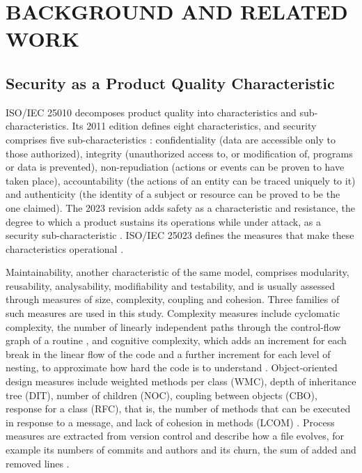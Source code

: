 \documentclass[a4paper,twoside]{article}
\begin{document}
\section{\uppercase{Background and Related Work}}
\label{sec:background}

\subsection{Security as a Product Quality Characteristic}

ISO/IEC 25010 decomposes product quality into characteristics and sub-characteristics. Its 2011 edition defines eight characteristics, and security comprises five sub-characteristics \cite{iso25010old}: confidentiality (data are accessible only to those authorized), integrity (unauthorized access to, or modification of, programs or data is prevented), non-repudiation (actions or events can be proven to have taken place), accountability (the actions of an entity can be traced uniquely to it) and authenticity (the identity of a subject or resource can be proved to be the one claimed). The 2023 revision adds safety as a characteristic and resistance, the degree to which a product sustains its operations while under attack, as a security sub-characteristic \cite{iso25010}. ISO/IEC 25023 defines the measures that make these characteristics operational \cite{iso25023}.

Maintainability, another characteristic of the same model, comprises modularity, reusability, analysability, modifiability and testability, and is usually assessed through measures of size, complexity, coupling and cohesion. Three families of such measures are used in this study. Complexity measures include cyclomatic complexity, the number of linearly independent paths through the control-flow graph of a routine \cite{mccabe1976}, and cognitive complexity, which adds an increment for each break in the linear flow of the code and a further increment for each level of nesting, to approximate how hard the code is to understand \cite{campbell2018}. Object-oriented design measures include weighted methods per class (WMC), depth of inheritance tree (DIT), number of children (NOC), coupling between objects (CBO), response for a class (RFC), that is, the number of methods that can be executed in response to a message, and lack of cohesion in methods (LCOM) \cite{chidamber1994}. Process measures are extracted from version control and describe how a file evolves, for example its numbers of commits and authors and its churn, the sum of added and removed lines \cite{spadini2018}.
\end{document}
